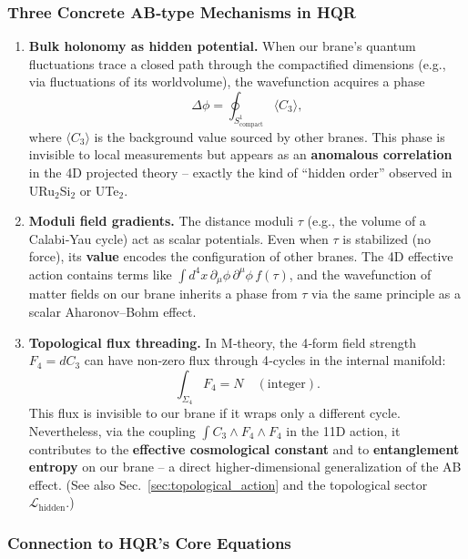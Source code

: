 \subsubsection*{Three Concrete AB‑type Mechanisms in HQR}

\begin{enumerate}
\item \textbf{Bulk holonomy as hidden potential.}
When our brane’s quantum fluctuations trace a closed path through the compactified dimensions
(e.g., via fluctuations of its worldvolume), the wavefunction acquires a phase
\[
\Delta \phi = \oint_{S^1_{\text{compact}}} \langle C_3 \rangle,
\]
where $\langle C_3 \rangle$ is the background value sourced by other branes.
This phase is invisible to local measurements but appears as an \textbf{anomalous correlation}
in the 4D projected theory – exactly the kind of “hidden order” observed in URu$_2$Si$_2$ or UTe$_2$.

\item \textbf{Moduli field gradients.}
The distance moduli $\tau$ (e.g., the volume of a Calabi‑Yau cycle) act as scalar potentials.
Even when $\tau$ is stabilized (no force), its \textbf{value} encodes the configuration of other branes.
The 4D effective action contains terms like $\int d^4x \, \partial_\mu \phi \, \partial^\mu \phi \, f(\tau)$,
and the wavefunction of matter fields on our brane inherits a phase from $\tau$ via the same principle
as a scalar Aharonov–Bohm effect.

\item \textbf{Topological flux threading.}
In M‑theory, the 4‑form field strength $F_4 = dC_3$ can have non‑zero flux through 4‑cycles in the internal manifold:
\[
\int_{\Sigma_4} F_4 = N \quad (\text{integer}).
\]
This flux is invisible to our brane if it wraps only a different cycle. Nevertheless, via the coupling
$\int C_3 \wedge F_4 \wedge F_4$ in the 11D action, it contributes to the \textbf{effective cosmological constant}
and to \textbf{entanglement entropy} on our brane – a direct higher‑dimensional generalization of the AB effect.
(See also Sec.~\ref{sec:topological_action} and the topological sector $\mathcal{L}_{\text{hidden}}$.)
\end{enumerate}

\subsubsection*{Connection to HQR’s Core Equations}

